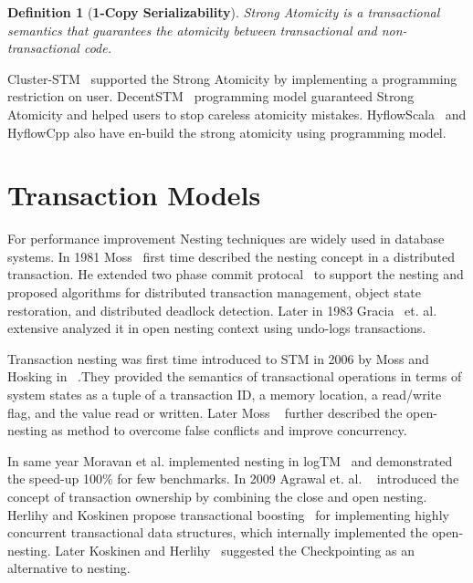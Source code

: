 \documentclass[12pt,english]{report}
\newtheorem{definition}{Definition}[section]
\begin{document}
\begin{definition}[\textbf{1-Copy Serializability}] 
Strong Atomicity is a transactional semantics that guarantees the atomicity between transactional and non-transactional code.
\end{definition}

Cluster-STM~\cite{Bocchino:2008:STM:1345206.1345242} supported the Strong Atomicity by implementing a programming restriction on user. DecentSTM~\cite{DecentSTM:5470446} programming model guaranteed Strong Atomicity and helped users to stop careless atomicity mistakes. HyflowScala~\cite{turcuhyflow2} and HyflowCpp also have en-build the strong atomicity using programming model.

\section{Transaction Models}

For performance improvement Nesting techniques are widely used in database systems. In 1981 Moss~\cite{moss1981nested} first time described the nesting concept in a distributed transaction. He extended two phase commit protocal~\cite{TwoPC:weikum1991principles} to support the nesting and proposed algorithms for distributed transaction management, object state restoration, and distributed deadlock detection. Later in 1983 Gracia~\cite{garcia1983using} et. al. extensive analyzed it in open nesting context using undo-logs transactions. 

Transaction nesting was first time introduced to STM in 2006 by  Moss and Hosking in ~\cite{moss2006nested}.They provided the semantics of transactional operations in terms of system states as a tuple of a transaction ID, a memory location, a read/write flag, and the value read or written. Later Moss ~\cite{moss2006open} further described the open-nesting as method to overcome false conflicts and improve concurrency. 

In same year Moravan et al. implemented nesting in logTM~\cite{moravan2006supporting} and demonstrated the speed-up 100\% for few benchmarks. In 2009 Agrawal et. al. ~\cite{agrawal2009safe} introduced the concept of transaction ownership by combining the close and open nesting. Herlihy and Koskinen propose transactional boosting~\cite{herlihy2008transactional} for implementing highly concurrent transactional data structures, which internally implemented the open-nesting. Later Koskinen and Herlihy~\cite{koskinen2008checkpoints} suggested the Checkpointing as an alternative to nesting.
\end{document}
